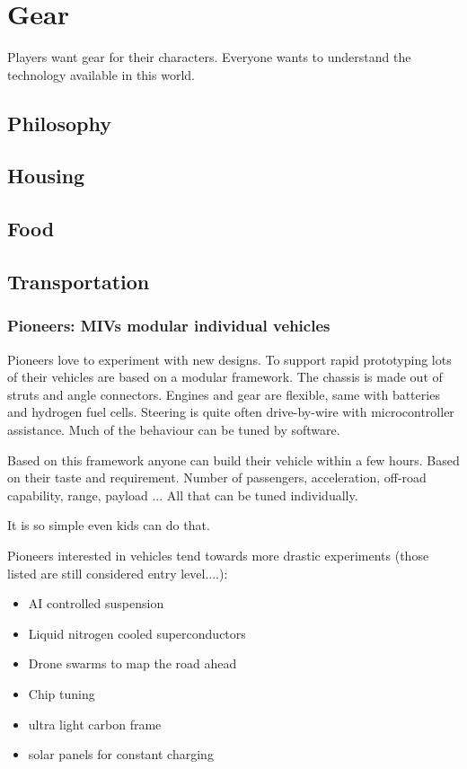 \chapter{Gear}

Players want gear for their characters. Everyone wants to understand the technology available in this world.

\section{Philosophy}

\section{Housing}

\section{Food}

\section{Transportation}

\subsection{Pioneers: MIVs modular individual vehicles}

Pioneers love to experiment with new designs. To support rapid prototyping lots of their vehicles are based on a modular framework. The chassis is made out of struts and angle connectors. Engines and gear are flexible, same with batteries and hydrogen fuel cells. Steering is quite often drive-by-wire with microcontroller assistance. Much of the behaviour can be tuned by software.

Based on this framework anyone can build their vehicle within a few hours. Based on their taste and requirement. Number of passengers, acceleration, off-road capability, range, payload ... All that can be tuned individually.

It is so simple even kids can do that.

Pioneers interested in vehicles tend towards more drastic experiments (those listed are still considered entry level....):

\begin{itemize}
    \item AI controlled suspension
    \item Liquid nitrogen cooled superconductors
    \item Drone swarms to map the road ahead
    \item Chip tuning
    \item ultra light carbon frame
    \item solar panels for constant charging
\end{itemize}


